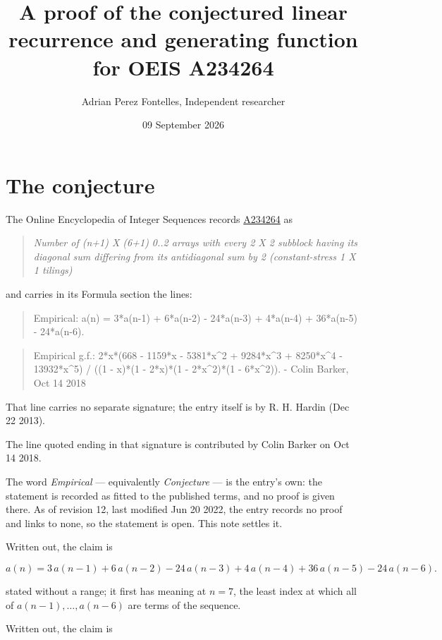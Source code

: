 \documentclass[11pt]{article}
\title{A proof of the conjectured linear recurrence and generating function for OEIS A234264}
\author{Adrian Perez Fontelles, Independent researcher}
\date{09 September 2026}
\theoremstyle{definition}
\begin{document}
\maketitle
\section{The conjecture}

The Online Encyclopedia of Integer Sequences records \href{https://oeis.org/A234264}{A234264} as

\begin{quote}\itshape Number of (n+1) X (6+1) 0..2 arrays with every 2 X 2 subblock having its diagonal sum differing from its antidiagonal sum by 2 (constant-stress 1 X 1 tilings)\end{quote}

and carries in its Formula section the lines:

\begin{quote}\ttfamily Empirical: a(n) = 3*a(n-1) + 6*a(n-2) - 24*a(n-3) + 4*a(n-4) + 36*a(n-5) - 24*a(n-6).\end{quote}

\begin{quote}\ttfamily Empirical g.f.: 2*x*(668 - 1159*x - 5381*x\textasciicircum{}2 + 9284*x\textasciicircum{}3 + 8250*x\textasciicircum{}4 - 13932*x\textasciicircum{}5) / ((1 - x)*(1 - 2*x)*(1 - 2*x\textasciicircum{}2)*(1 - 6*x\textasciicircum{}2)). - Colin Barker, Oct 14 2018\end{quote}

That line carries no separate signature; the entry itself is by R. H. Hardin (Dec 22 2013).

The line quoted ending in that signature is contributed by Colin Barker on Oct 14 2018.

The word {\itshape Empirical} --- equivalently {\itshape Conjecture} --- is the entry's own: the statement is recorded as fitted to the published terms, and no proof is given there. As of revision 12, last modified Jun 20 2022, the entry records no proof and links to none, so the statement is open. This note settles it.

Written out, the claim is

\[a(n) = 3\,a(n-1) + 6\,a(n-2) - 24\,a(n-3) + 4\,a(n-4) + 36\,a(n-5) - 24\,a(n-6).\]

stated without a range; it first has meaning at $n = 7$, the least index at which all of $a(n-1),\dots,a(n-6)$ are terms of the sequence.

Written out, the claim is
\end{document}
